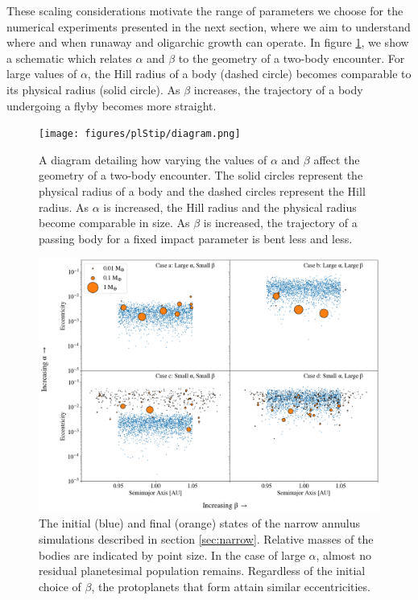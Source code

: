 These scaling considerations motivate the range of parameters we choose for the numerical experiments presented in the next section, where we aim to understand where and when runaway and oligarchic growth can operate. In figure \ref{fig:alpha_beta_diagram}, we show a schematic which relates $\alpha$ and $\beta$ to the geometry of a two-body encounter. For large values of $\alpha$, the Hill radius of a body (dashed circle) becomes comparable to its physical radius (solid circle). As $\beta$ increases, the trajectory of a body undergoing a flyby becomes more straight.

\begin{figure}
\begin{center}
    \texttt{[image: figures/plStip/diagram.png]}
    \caption{A diagram detailing how varying the values of $\alpha$ and $\beta$ affect the geometry of a two-body encounter. The solid circles represent the physical radius of a body and the dashed circles represent the Hill radius. As $\alpha$ is increased, the Hill radius and the physical radius become comparable in size. As $\beta$ is increased, the trajectory of a passing body for a fixed impact parameter is bent less and less.
      \label{fig:alpha_beta_diagram}}
\end{center}
\end{figure}

\begin{figure}
\begin{center}
    \includegraphics[width=\textwidth]{figures/plStip/alpha_beta.png}
    \caption{The initial (blue) and final (orange) states of the narrow annulus simulations described in section \ref{sec:narrow}. 
    Relative masses of the bodies are indicated by point size. In the case of large $\alpha$, almost no residual planetesimal 
    population remains. Regardless of the initial choice of $\beta$, the protoplanets that form attain similar eccentricities. 
    \label{fig:alpha_beta}}
\end{center}
\end{figure}

